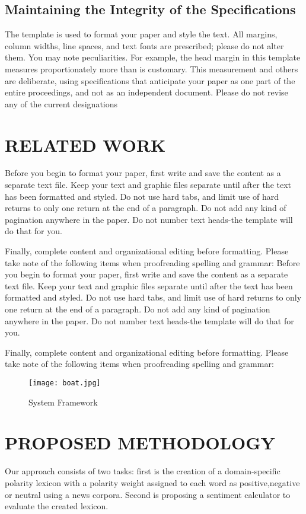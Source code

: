 \documentclass[a4paper, 10pt, conference]{ieeeconf}      %
\begin{document}
\subsection{Maintaining the Integrity of the Specifications}

The template is used to format your paper and style the text. All margins, column widths, line spaces, and text fonts are prescribed; please do not alter them. You may note peculiarities. For example, the head margin in this template measures proportionately more than is customary. This measurement and others are deliberate, using specifications that anticipate your paper as one part of the entire proceedings, and not as an independent document. Please do not revise any of the current designations

\section{RELATED WORK}

Before you begin to format your paper, first write and save the content as a separate text file. Keep your text and graphic files separate until after the text has been formatted and styled. Do not use hard tabs, and limit use of hard returns to only one return at the end of a paragraph. Do not add any kind of pagination anywhere in the paper. Do not number text heads-the template will do that for you.

Finally, complete content and organizational editing before formatting. Please take note of the following items when proofreading spelling and grammar:
Before you begin to format your paper, first write and save the content as a separate text file. Keep your text and graphic files separate until after the text has been formatted and styled. Do not use hard tabs, and limit use of hard returns to only one return at the end of a paragraph. Do not add any kind of pagination anywhere in the paper. Do not number text heads-the template will do that for you.

Finally, complete content and organizational editing before formatting. Please take note of the following items when proofreading spelling and grammar:
\begin{figure*}[ht]
	\centering
	\texttt{[image: boat.jpg]}
	\caption{System Framework}
	\label{fig:boat1}
\end{figure*}
\section{PROPOSED METHODOLOGY}
Our approach consists of two tasks: first is the creation of a domain-specific polarity lexicon with a polarity weight assigned to each word as positive,negative or neutral using a news corpora. Second is proposing a sentiment calculator to evaluate the created lexicon.
\end{document}
